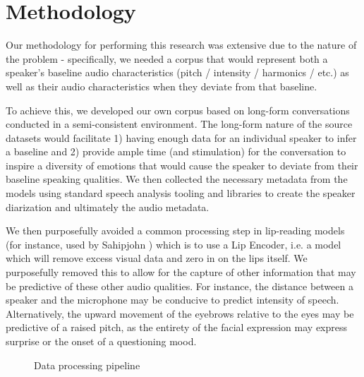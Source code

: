 \documentclass[10pt,twocolumn,letterpaper]{article}
\begin{document}
\section{Methodology}
\label{sec:methodology}

Our methodology for performing this research was extensive due to the nature of the problem - specifically, we needed a corpus that would represent both a speaker's baseline audio characteristics (pitch / intensity / harmonics / etc.) as well as their audio characteristics when they deviate from that baseline. 

To achieve this, we developed our own corpus based on long-form conversations conducted in a semi-consistent environment. The long-form nature of the source datasets would facilitate 1) having enough data for an individual speaker to infer a baseline and 2) provide ample time (and stimulation) for the conversation to inspire a diversity of emotions that would cause the speaker to deviate from their baseline speaking qualities. We then collected the necessary metadata from the models using standard speech analysis tooling and libraries to create the speaker diarization and ultimately the audio metadata. 

We then purposefully avoided a common processing step in lip-reading models (for instance, used by Sahipjohn \etal \cite{RobustL2S} )  which is to use a Lip Encoder, i.e. a model which will remove excess visual data and zero in on the lips itself. We purposefully removed this to allow for the capture of other information that may be predictive of these other audio qualities. For instance, the distance between a speaker and the microphone may be conducive to predict intensity of speech. Alternatively, the upward movement of the eyebrows relative to the eyes may be predictive of a raised pitch, as the entirety of the facial expression may express surprise or the onset of a questioning mood.   

\begin{figure}[t]
   \caption{Data processing pipeline}
   \label{fig:onecol}
\end{figure}
\end{document}
